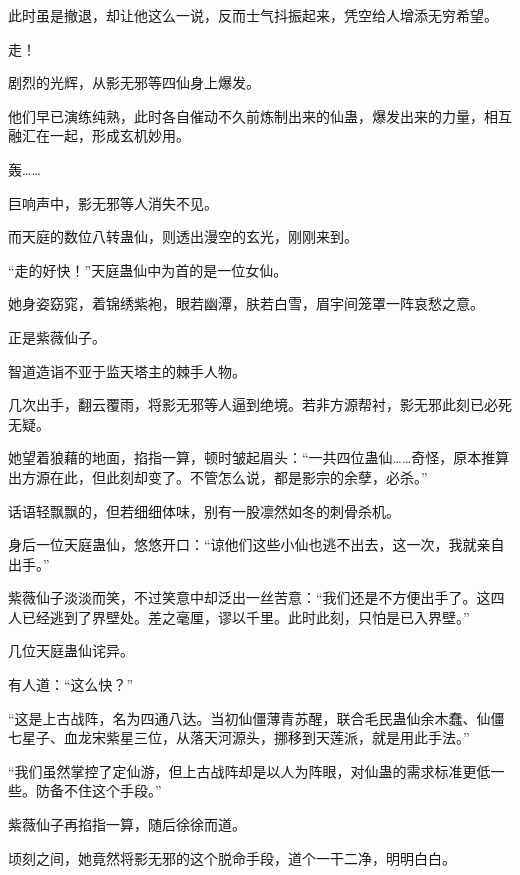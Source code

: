 \begin{this_body}
此时虽是撤退，却让他这么一说，反而士气抖振起来，凭空给人增添无穷希望。

走！

剧烈的光辉，从影无邪等四仙身上爆发。

他们早已演练纯熟，此时各自催动不久前炼制出来的仙蛊，爆发出来的力量，相互融汇在一起，形成玄机妙用。

轰……

巨响声中，影无邪等人消失不见。

而天庭的数位八转蛊仙，则透出漫空的玄光，刚刚来到。

“走的好快！”天庭蛊仙中为首的是一位女仙。

她身姿窈窕，着锦绣紫袍，眼若幽潭，肤若白雪，眉宇间笼罩一阵哀愁之意。

正是紫薇仙子。

智道造诣不亚于监天塔主的棘手人物。

几次出手，翻云覆雨，将影无邪等人逼到绝境。若非方源帮衬，影无邪此刻已必死无疑。

她望着狼藉的地面，掐指一算，顿时皱起眉头：“一共四位蛊仙……奇怪，原本推算出方源在此，但此刻却变了。不管怎么说，都是影宗的余孽，必杀。”

话语轻飘飘的，但若细细体味，别有一股凛然如冬的刺骨杀机。

身后一位天庭蛊仙，悠悠开口：“谅他们这些小仙也逃不出去，这一次，我就亲自出手。”

紫薇仙子淡淡而笑，不过笑意中却泛出一丝苦意：“我们还是不方便出手了。这四人已经逃到了界壁处。差之毫厘，谬以千里。此时此刻，只怕是已入界壁。”

几位天庭蛊仙诧异。

有人道：“这么快？”

“这是上古战阵，名为四通八达。当初仙僵薄青苏醒，联合毛民蛊仙余木蠢、仙僵七星子、血龙宋紫星三位，从落天河源头，挪移到天莲派，就是用此手法。”

“我们虽然掌控了定仙游，但上古战阵却是以人为阵眼，对仙蛊的需求标准更低一些。防备不住这个手段。”

紫薇仙子再掐指一算，随后徐徐而道。

顷刻之间，她竟然将影无邪的这个脱命手段，道个一干二净，明明白白。

\end{this_body}


